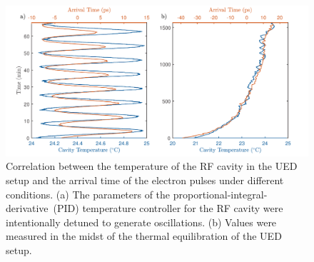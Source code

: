 \begin{figure}[t!]
  \centering
  \includegraphics[width = \textwidth]{Figures/fig_UED_tempvsstreak.pdf}
  \caption[Correlation between the temperature of the RF cavity in the UED setup and
  the arrival time of the electron pulses under different conditions.]{
    Correlation between the temperature of the RF cavity in the UED setup and
    the arrival time of the electron pulses under different conditions.
    (a) The parameters of the proportional-integral-derivative~(PID) temperature controller
    for the RF cavity were intentionally detuned to generate oscillations.
    (b) Values were measured in the midst of the thermal equilibration of the UED setup.
  }
  \label{fig: UED-temp-vs-streak}
\end{figure}

